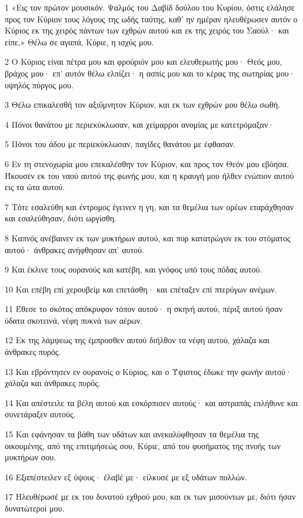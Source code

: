 \par 1 «Εις τον πρώτον μουσικόν. Ψαλμός του Δαβίδ δούλου του Κυρίου, όστις ελάλησε προς τον Κύριον τους λόγους της ωδής ταύτης, καθ' ην ημέραν ηλευθέρωσεν αυτόν ο Κύριος εκ της χειρός πάντων των εχθρών αυτού και εκ της χειρός του Σαούλ· και είπε,» Θέλω σε αγαπά, Κύριε, η ισχύς μου.
\par 2 Ο Κύριος είναι πέτρα μου και φρούριόν μου και ελευθερωτής μου· Θεός μου, βράχος μου· επ' αυτόν θέλω ελπίζει· η ασπίς μου και το κέρας της σωτηρίας μου· υψηλός πύργος μου.
\par 3 Θέλω επικαλεσθή τον αξιΰμνητον Κύριον, και εκ των εχθρών μου θέλω σωθή.
\par 4 Πόνοι θανάτου με περιεκύκλωσαν, και χείμαρροι ανομίας με κατετρόμαξαν·
\par 5 Πόνοι του άδου με περιεκύκλωσαν, παγίδες θανάτου με έφθασαν.
\par 6 Εν τη στενοχωρία μου επεκαλέσθην τον Κύριον, και προς τον Θεόν μου εβόησα. Ήκουσεν εκ του ναού αυτού της φωνής μου, και η κραυγή μου ήλθεν ενώπιον αυτού εις τα ώτα αυτού.
\par 7 Τότε εσαλεύθη και έντρομος έγεινεν η γη, και τα θεμέλια των ορέων εταράχθησαν και εσαλεύθησαν, διότι ωργίσθη.
\par 8 Καπνός ανέβαινεν εκ των μυκτήρων αυτού, και πυρ κατατρώγον εκ του στόματος αυτού· άνθρακες ανήφθησαν απ' αυτού.
\par 9 Και έκλινε τους ουρανούς και κατέβη, και γνόφος υπό τους πόδας αυτού.
\par 10 Και επέβη επί χερουβείμ και επετάσθη· και επέταξεν επί πτερύγων ανέμων.
\par 11 Έθεσε το σκότος απόκρυφον τόπον αυτού· η σκηνή αυτού, πέριξ αυτού ήσαν ύδατα σκοτεινά, νέφη πυκνά των αέρων.
\par 12 Εκ της λάμψεως της έμπροσθεν αυτού διήλθον τα νέφη αυτού, χάλαζα και άνθρακες πυρός.
\par 13 Και εβρόντησεν εν ουρανοίς ο Κύριος, και ο Ύψιστος έδωκε την φωνήν αυτού· χάλαζα και άνθρακες πυρός.
\par 14 Και απέστειλε τα βέλη αυτού και εσκόρπισεν αυτούς· και αστραπάς επλήθυνε και συνετάραξεν αυτούς.
\par 15 Και εφάνησαν τα βάθη των υδάτων και ανεκαλύφθησαν τα θεμέλια της οικουμένης, από της επιτιμήσεώς σου, Κύριε, από του φυσήματος της πνοής των μυκτήρων σου.
\par 16 Εξαπέστειλεν εξ ύψους· έλαβέ με· είλκυσέ με εξ υδάτων πολλών.
\par 17 Ηλευθέρωσέ με εκ του δυνατού εχθρού μου, και εκ των μισούντων με, διότι ήσαν δυνατώτεροί μου.
